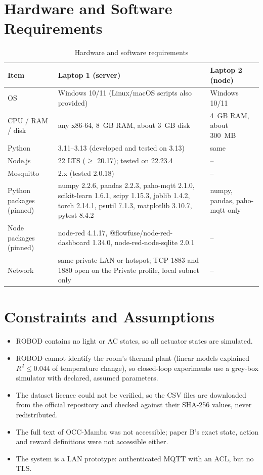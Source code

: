 \documentclass[12pt,a4paper,oneside]{report}
\begin{document}
\section{Hardware and Software Requirements}
\begin{table}[H]
\centering
\caption{Hardware and software requirements}
\label{tab:hwsw}
\begin{tabularx}{\textwidth}{@{}L{3.0cm}YL{3.6cm}@{}}
\toprule
\textbf{Item} & \textbf{Laptop 1 (server)} & \textbf{Laptop 2 (node)}\\
\midrule
OS & Windows 10/11 (Linux/macOS scripts also provided) & Windows 10/11\\
CPU / RAM / disk & any x86-64, 8~GB RAM, about 3~GB disk & 4~GB RAM, about 300~MB\\
Python & 3.11--3.13 (developed and tested on 3.13) & same\\
Node.js & 22 LTS ($\geq$ 20.17); tested on 22.23.4 & --\\
Mosquitto & 2.x (tested 2.0.18) & --\\
Python packages (pinned) & numpy 2.2.6, pandas 2.2.3, paho-mqtt 2.1.0, scikit-learn 1.6.1, scipy 1.15.3, joblib 1.4.2, torch 2.14.1, psutil 7.1.3, matplotlib 3.10.7, pytest 8.4.2 & numpy, pandas, paho-mqtt only\\
Node packages (pinned) & node-red 4.1.17, @flowfuse/node-red-dashboard 1.34.0, node-red-node-sqlite 2.0.1 & --\\
Network & same private LAN or hotspot; TCP 1883 and 1880 open on the Private profile, local subnet only & --\\
\bottomrule
\end{tabularx}
\end{table}

\section{Constraints and Assumptions}
\begin{itemize}
\item ROBOD contains no light or AC states, so all actuator states are simulated.
\item ROBOD cannot identify the room's thermal plant (linear models explained $R^2 \leq 0.044$ of temperature
  change), so closed-loop experiments use a grey-box simulator with declared, assumed parameters.
\item The dataset licence could not be verified, so the CSV files are downloaded from the official repository and
  checked against their SHA-256 values, never redistributed.
\item The full text of OCC-Mamba was not accessible; paper B's exact state, action and reward definitions were not
  accessible either.
\item The system is a LAN prototype: authenticated MQTT with an ACL, but no TLS.
\end{itemize}
\end{document}
